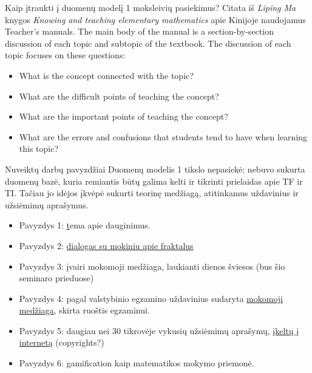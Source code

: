 \documentclass[xcolor={dvipsnames}]{beamer}
\begin{document}
\begin{frame}[fragile]{Kaip įtraukti į duomenų modelį 1 moksleivių pasiekimus?}
Citata iš \textit{Liping Ma} knygos \textit{Knowing and teaching elementary mathematics} apie Kinijoje naudojamus Teacher's manuals. The main body of the manual is a section-by-section discussion of each topic and subtopic of the textbook. The discussion of each topic focuses on these questions:
\begin{itemize}
\item<1-> What is the concept connected with the topic?
\item<2-> What are the difficult points of teaching the concept?
\item<3-> What are the important points of teaching the concept?
\item<4-> What are the errors and confusions that students tend to have when learning this topic?
\end{itemize}
\end{frame}

\begin{frame}[fragile]{Nuveiktų darbų pavyzdžiai}
Duomenų modelis 1 tikslo nepasiekė: nebuvo sukurta duomenų bazė, kuria remiantis būtų galima kelti ir tikrinti prielaidas apie TF ir TI. Tačiau jo idėjos įkvėpė sukurti teorinę medžiagą, atitinkamus uždavinius ir užsiėmimų aprašymus. 
\begin{itemize}
\item<1-> Pavyzdys 1: \href{https://github.com/loijord/matematikos\_pamokos/blob/master/programa/Mantas/Projektas2/dauginimas.pdf} tema apie dauginimus.
\item<2-> Pavyzdys 2: \href{https://github.com/loijord/General/blob/master/READING/project\_topics/fraktalai/fraktalai.pdf}{dialogas su mokiniu apie fraktalus}
\item<3-> Pavyzdys 3: įvairi mokomoji medžiaga, laukianti dienos šviesos (bus šio seminaro prieduose)
\item<4-> Pavyzdys 4: pagal valstybinio egzamino uždavinius sudaryta \href{https://github.com/loijord/egzanalysis/tree/master/READING}{mokomoji medžiaga}, skirta ruoštis egzaminui.
\item<5-> Pavyzdys 5: daugiau nei 30 tikrovėje vykusių užsiėmimų aprašymų, \href{https://github.com/loijord/matematikos\_pamokos/tree/master/programa}{įkeltų į internetą} (copyrights?)
\item<6-> Pavyzdys 6: gamification kaip matematikos mokymo priemonė.
\end{itemize}
\end{frame}
\end{document}
